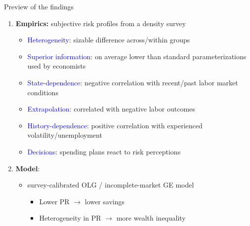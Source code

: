 \documentclass{beamer}
\begin{document}
\begin{frame}{Preview of the findings}
	\begin{enumerate}
		\item \textbf{Empirics:} subjective risk profiles from a density survey
		\begin{itemize}
			\item \textcolor{blue}{Heterogeneity}: sizable difference across/within groups
			\item \textcolor{blue}{Superior information}: on average lower than standard parameterizations used by economists 
			\item \textcolor{blue}{State-dependence}: negative correlation with recent/past labor market conditions 
				\item \textcolor{blue}{Extrapolation}:  correlated with negative labor outcomes
			\item \textcolor{blue}{History-dependence}: positive correlation with experienced volatility/unemployment 
			\item \textcolor{blue}{Decisions}: spending plans react to risk perceptions
			

		
		\end{itemize}
\pause
		\item \textbf{Model}: 
		\begin{itemize}
			\item survey-calibrated OLG / incomplete-market GE model 
\begin{itemize}
	\item Lower PR $\rightarrow$ lower savings 
	\item Heterogeneity in PR $\rightarrow$ more wealth inequality 
\end{itemize}
		\end{itemize} 
	\end{enumerate}
\end{frame}
\end{document}
